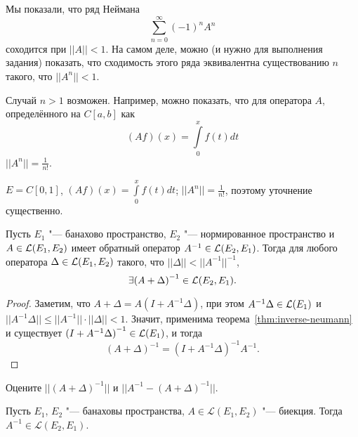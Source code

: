 \documentclass[main]{subfiles}
\begin{document}
\begin{remark}
  Мы показали, что ряд Неймана
  \[
    \sum_{n=0}^\infty (-1)^n A^n
  \]
  соходится при \( ||A|| < 1 \).
  На самом деле, можно (и нужно для выполнения задания)
  показать, что сходимость этого ряда эквивалентна
  существованию \( n \) такого, что \( ||A^n|| < 1 \).
\end{remark}

\begin{example}
  Случай \( n > 1 \) возможен.
  Например, можно показать, что для
  оператора \( A \),
  определённого на \( C[a, b] \) как
  \[
    (Af)(x) = \int\limits_0^x f(t) dt
  \]
  \( ||A^n|| = \frac{1}{n!} \).
\end{example}

\begin{example}
  \( E = C[0, 1] \), \( (Af)(x) = \int\limits_0^x f(t) dt \);
  \( ||A^n|| = \frac{1}{n!} \), поэтому уточнение существенно.
\end{example}

\begin{theorem}
  Пусть \( E_1 \) "--- банахово пространство,
  \( E_2 \) "--- нормированное пространство
  и \( A \in \Linears{E_1}[E_2] \)
  имеет обратный оператор
  \( A^{-1} \in \Linears{E_2}[E_1] \).
  Тогда для любого оператора
  \( \Delta \in \Linears{E_1}[E_2] \)
  такого, что \( ||\Delta|| < ||A^{-1}||^{-1} \),
  \[
    \exists {(A + \Delta)}^{-1} \in \Linears{E_2}[E_1].
  \]
\end{theorem}
\begin{proof}
  Заметим, что
  \( A + \Delta = A (I + A^{-1} \Delta) \),
  при этом \( A^{-1} \Delta \in \Linears{E_1} \)
  и \( ||A^{-1} \Delta|| \le ||A^{-1}|| \cdot ||\Delta|| < 1 \).
  Значит, применима теорема~\ref{thm:inverse-neumann}
  и существует \( {(I + A^{-1} \Delta)}^{-1} \in \Linears{E_1} \),
  и тогда
  \[
    {(A + \Delta)}^{-1} = {(I + A^{-1} \Delta)}^{-1} A^{-1}.
  \]
\end{proof}

\begin{exercise}
  Оцените \( ||{(A + \Delta)}^{-1}|| \)
  и \( ||A^{-1} - {(A + \Delta)}^{-1}|| \).
\end{exercise}

\begin{theorem}
  Пусть \( E_1 \), \( E_2 \) "--- банаховы пространства,
  \( A \in \mathcal{L}(E_1, E_2) \) "--- биекция.
  Тогда \( A^{-1} \in \mathcal{L}(E_2, E_1) \).
\end{theorem}
\end{document}
